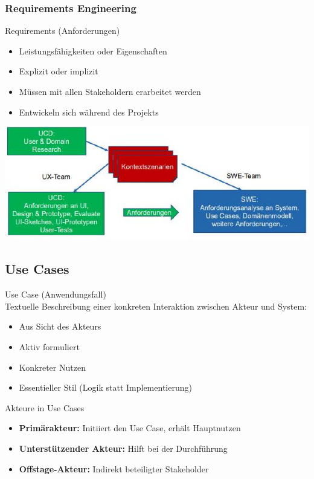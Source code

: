 \subsubsection{Requirements Engineering}

\begin{definition}{Requirements (Anforderungen)}
\begin{itemize}
    \item Leistungsfähigkeiten oder Eigenschaften
    \item Explizit oder implizit
    \item Müssen mit allen Stakeholdern erarbeitet werden
    \item Entwickeln sich während des Projekts
\end{itemize}
\includegraphics[width=\linewidth]{images/2024_12_29_0d1d7b5551ea1b4b41bdg-04(1)}
\end{definition}

\subsection{Use Cases}

\begin{definition}{Use Case (Anwendungsfall)}\\
Textuelle Beschreibung einer konkreten Interaktion zwischen Akteur und System:
\begin{itemize}
    \item Aus Sicht des Akteurs
    \item Aktiv formuliert
    \item Konkreter Nutzen
    \item Essentieller Stil (Logik statt Implementierung)
\end{itemize}
\end{definition}

\begin{theorem}{Akteure in Use Cases}
\begin{itemize}
    \item \textbf{Primärakteur:} Initiiert den Use Case, erhält Hauptnutzen
    \item \textbf{Unterstützender Akteur:} Hilft bei der Durchführung
    \item \textbf{Offstage-Akteur:} Indirekt beteiligter Stakeholder
\end{itemize}
\end{theorem}

